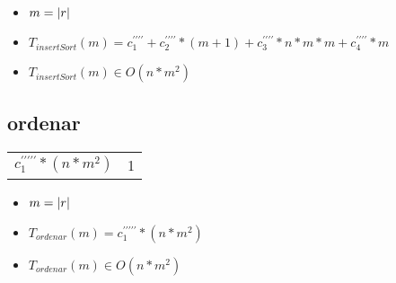 \documentclass{article}
\begin{document}
    \begin{itemize}
        \item $m = |r|$
        \item $T_{insertSort}(m) = c^{\prime\prime\prime\prime}_1 + c^{\prime\prime\prime\prime}_2 * (m+1) + c^{\prime\prime\prime\prime}_3*n*m*m + c^{\prime\prime\prime\prime}_4 * m$
        \item $T_{insertSort}(m) \in O(n*m^{2})$
    \end{itemize}

    \subsection*{ordenar}

    \begin{minipage}{0.70\textwidth}
        
    \end{minipage}
    \hfill
    \begin{minipage}{0.25\textwidth}
        \begin{tabular}{|c|c}

            $c^{\prime\prime\prime\prime\prime}_1*(n*m^2)$ & 1 \\

        \end{tabular}
    \end{minipage}

    \begin{itemize}
        \item $m = |r|$
        \item $T_{ordenar}(m) = c^{\prime\prime\prime\prime\prime}_1*(n*m^2)$
        \item $T_{ordenar}(m) \in O(n*m^{2})$
    \end{itemize}
\end{document}
